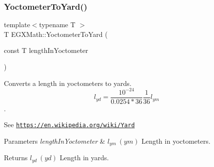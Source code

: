 \subsubsection{\texorpdfstring{Yoctometer\+To\+Yard()}{YoctometerToYard()}}
{\footnotesize\ttfamily template$<$typename T $>$ \\
T E\+G\+X\+Math\+::\+Yoctometer\+To\+Yard (\begin{DoxyParamCaption}\item[{const T}]{length\+In\+Yoctometer }\end{DoxyParamCaption})}



Converts a length in yoctometers to yards. \[ l_{yd}= \frac{10^{-24}}{0.0254 * 36} \frac{1}{36} l_{ym} \]. 

See \href{https://en.wikipedia.org/wiki/Yard}{\tt https\+://en.\+wikipedia.\+org/wiki/\+Yard} 
\begin{DoxyParams}{Parameters}
{\em length\+In\+Yoctometer} & $ l_{ym}\ (ym)$ Length in yoctometers. \\
\hline
\end{DoxyParams}
\begin{DoxyReturn}{Returns}
$ l_{yd}\ (yd)$ Length in yards. 
\end{DoxyReturn}
